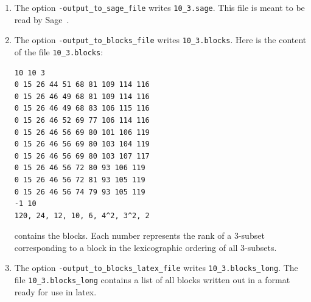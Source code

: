 \begin{enumerate}
{\scriptsize
\begin{verbatim}
10 10 30
0 1 2 10 13 14 20 25 26 31 33 35 41 44 47 52 53 58 62 66 69 74 78 79 85 87 89 96 97 98 
0 1 2 10 13 14 20 25 26 31 33 35 41 44 47 52 54 58 62 66 69 73 78 79 85 87 89 96 97 98 
0 1 2 10 13 14 20 25 26 31 33 35 41 44 47 52 54 58 62 67 69 73 76 79 85 88 89 96 97 98 
0 1 2 10 13 14 20 25 26 31 33 35 41 44 47 52 56 58 62 67 69 73 78 79 84 86 89 95 97 98 
0 1 2 10 13 14 20 25 26 31 33 35 41 47 48 52 54 57 62 66 68 73 77 79 84 86 89 95 98 99 
0 1 2 10 13 14 20 25 26 31 33 35 41 47 48 52 54 57 62 66 68 73 78 79 84 86 89 95 97 99 
0 1 2 10 13 14 20 25 26 31 33 35 41 47 48 52 54 57 62 66 69 73 78 79 84 86 88 95 97 99 
0 1 2 10 13 14 20 25 26 31 33 37 41 45 48 52 54 57 62 66 68 73 75 79 84 86 89 97 98 99 
0 1 2 10 13 14 20 25 26 31 33 37 41 45 48 52 54 57 62 66 68 73 75 79 84 88 89 96 97 99 
0 1 2 10 13 14 20 25 26 31 33 37 41 45 48 52 54 57 62 66 68 73 76 79 84 88 89 95 97 99 
-1 10
120, 24, 12, 10, 6, 4^2, 3^2, 2
\end{verbatim}}
\item
The option \verb'-output_to_sage_file'
writes \verb'10_3.sage'. 
This file is meant to be read by Sage~\cite{SteinJoyner2005}.
\item
The option \verb'-output_to_blocks_file'
writes \verb'10_3.blocks'. 
Here is the content of the file \verb'10_3.blocks':
\begin{verbatim}
10 10 3
0 15 26 44 51 68 81 109 114 116 
0 15 26 46 49 68 81 109 114 116 
0 15 26 46 49 68 83 106 115 116 
0 15 26 46 52 69 77 106 114 116 
0 15 26 46 56 69 80 101 106 119 
0 15 26 46 56 69 80 103 104 119 
0 15 26 46 56 69 80 103 107 117 
0 15 26 46 56 72 80 93 106 119 
0 15 26 46 56 72 81 93 105 119 
0 15 26 46 56 74 79 93 105 119 
-1 10
120, 24, 12, 10, 6, 4^2, 3^2, 2
\end{verbatim}
contains the blocks. 
Each number represents the rank of a 3-subset corresponding to a block 
in the lexicographic ordering of all 3-subsets. 
\item
The option \verb'-output_to_blocks_latex_file'
writes \verb'10_3.blocks_long'. 
The file 
\verb'10_3.blocks_long' contains a list of all blocks written out in a format ready for use in latex.
\end{enumerate}

\bigskip

